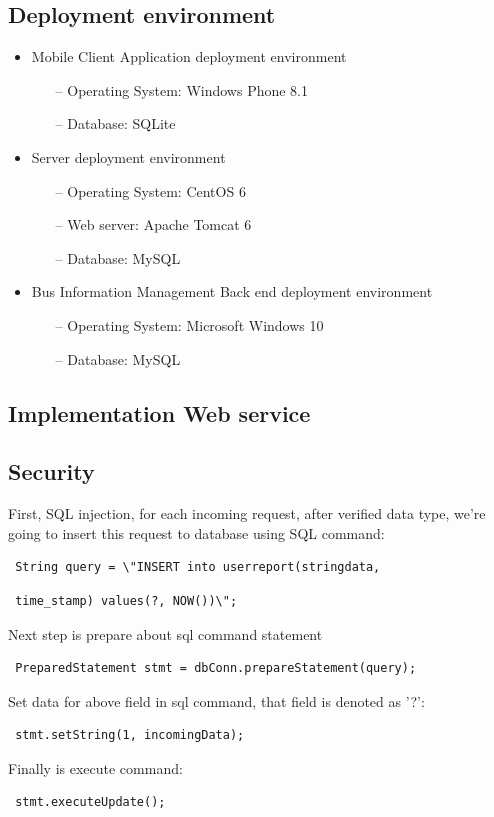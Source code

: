 \subsection{Deployment environment}
	\begin{itemize}
		\item{Mobile Client Application deployment environment}
		\begin{itemize}
			\item [--]{Operating System}: Windows Phone 8.1
			\item [--]{Database}: SQLite
		\end{itemize}
		\item{Server deployment environment}
		\begin{itemize}
			\item [--]{Operating System}: CentOS 6
			\item [--]{Web server}: Apache Tomcat 6
			\item [--]{Database}: MySQL
		\end{itemize}
		\item{Bus Information Management Back end deployment environment}
		\begin{itemize}
			\item [--]{Operating System}: Microsoft Windows 10
			\item [--]{Database}: MySQL
		\end{itemize}
	\end{itemize}
\subsection{Implementation Web service}
	\subsection{Security}
		\indent First, SQL injection, for each incoming request, after verified data type, we're going to insert this request to database using SQL command:
			\begin{verbatim} String query = \"INSERT into userreport(stringdata, \end{verbatim}
			\begin{verbatim} time_stamp) values(?, NOW())\"; \end{verbatim}
		Next step is prepare about sql command statement
			\begin{verbatim} PreparedStatement stmt = dbConn.prepareStatement(query); \end{verbatim}
		Set data for above field in sql command, that field is denoted as '?':
			\begin{verbatim} stmt.setString(1, incomingData); \end{verbatim}
		Finally is execute command:
			\begin{verbatim} stmt.executeUpdate(); \end{verbatim}
		
